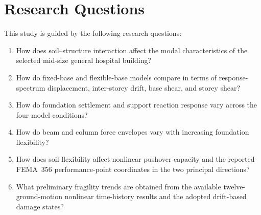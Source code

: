 \section{Research Questions}
This study is guided by the following research questions:
\begin{enumerate}
    \item How does soil--structure interaction affect the modal characteristics of the selected mid-size general hospital building?
    \item How do fixed-base and flexible-base models compare in terms of response-spectrum displacement, inter-storey drift, base shear, and storey shear?
    \item How do foundation settlement and support reaction response vary across the four model conditions?
    \item How do beam and column force envelopes vary with increasing foundation flexibility?
    \item How does soil flexibility affect nonlinear pushover capacity and the reported FEMA~356 performance-point coordinates in the two principal directions?
    \item What preliminary fragility trends are obtained from the available twelve-ground-motion nonlinear time-history results and the adopted drift-based damage states?
\end{enumerate}
